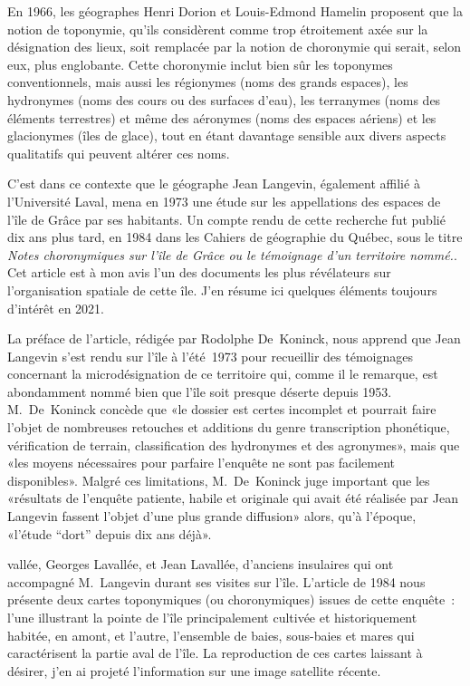 \documentclass[12pt]{article}
\begin{document}
En 1966, les géographes Henri Dorion et Louis-Edmond Hamelin proposent que la notion de toponymie, qu'ils considèrent comme trop étroitement axée sur la désignation des lieux, soit remplacée par la notion de choronymie qui serait, selon eux, plus englobante. Cette choronymie inclut bien sûr les toponymes conventionnels, mais aussi les régionymes (noms des grands espaces), les hydronymes (noms des cours ou des surfaces d'eau), les terranymes (noms des éléments terrestres) et même des aéronymes (noms des espaces aériens) et les glacionymes (îles de glace), tout en étant davantage sensible aux divers aspects qualitatifs qui peuvent altérer ces noms.  

C'est dans ce contexte que le géographe Jean Langevin, également affilié à l'Université Laval, mena en 1973 une étude sur les appellations des espaces de l'île de Grâce par ses habitants. Un compte rendu de cette recherche fut publié dix ans plus tard, en 1984 dans les Cahiers de géographie du Québec, sous le titre \emph{Notes choronymiques sur l'île de Grâce ou le témoignage d'un territoire nommé.}. Cet article est à mon avis l'un des documents les plus révélateurs sur l'organisation spatiale de cette île. J'en résume ici quelques éléments toujours d'intérêt en 2021.  

La préface de l'article, rédigée par Rodolphe De Koninck, nous apprend que Jean Langevin s'est rendu sur l'île à l'été 1973 pour recueillir des témoignages concernant la microdésignation de ce territoire qui, comme il le remarque, est abondamment nommé bien que l'île soit presque déserte depuis 1953. M. De Koninck concède que «le dossier est certes incomplet et pourrait faire l'objet de nombreuses retouches et additions du genre transcription phonétique, vérification de terrain, classification des hydronymes et des agronymes», mais que «les moyens nécessaires pour parfaire l'enquête ne sont pas facilement disponibles». Malgré ces limitations, M. De Koninck juge important que les «résultats de l'enquête patiente, habile et originale qui avait été réalisée par Jean Langevin fassent l’objet d’une plus grande diffusion» alors, qu’à l’époque, «l’étude “dort” depuis dix ans déjà».  

vallée, Georges Lavallée, et Jean Lavallée, d'anciens insulaires qui ont accompagné M. Langevin durant ses visites sur l'île. L'article de 1984 nous présente deux cartes toponymiques (ou choronymiques) issues de cette enquête : l'une illustrant la pointe de l'île principalement cultivée et historiquement habitée, en amont, et l'autre, l'ensemble de baies, sous-baies et mares qui caractérisent la partie aval de l'île. La reproduction de ces cartes laissant à désirer, j'en ai projeté l'information sur une image satellite récente.  
\end{document}

